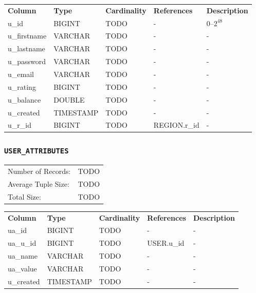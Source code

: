 \documentclass[a4paper,10pt]{article}
\begin{document}
\noindent \begin{tabular*}{\textwidth}{@{\extracolsep{\fill}} lllll}
\textbf{Column} & \textbf{Type} & \textbf{Cardinality} & \textbf{References} & \textbf{Description} \\
u\_id              & BIGINT     & TODO & -               & 0--$2^{48}$ \\
u\_firstname       & VARCHAR    & TODO & -               & - \\
u\_lastname        & VARCHAR    & TODO & -               & - \\
u\_password        & VARCHAR    & TODO & -               & - \\
u\_email           & VARCHAR    & TODO & -               & - \\
u\_rating          & BIGINT     & TODO & -               & - \\
u\_balance         & DOUBLE     & TODO & -               & - \\
u\_created         & TIMESTAMP  & TODO & -               & - \\
u\_r\_id           & BIGINT     & TODO & REGION.r\_id    & - \\
\end{tabular*}

\subsubsection{\texttt{USER\_ATTRIBUTES}}

\begin{tabular}{ll}
Number of Records:      & TODO \\
Average Tuple Size:     & TODO \\
Total Size:             & TODO \\
\end{tabular}

\vspace*{0.1in}

\noindent \begin{tabular*}{\textwidth}{@{\extracolsep{\fill}} lllll}
\textbf{Column} & \textbf{Type} & \textbf{Cardinality} & \textbf{References} & \textbf{Description} \\
ua\_id             & BIGINT     & TODO & -               & - \\
ua\_u\_id          & BIGINT     & TODO & USER.u\_id      & - \\
ua\_name           & VARCHAR    & TODO & -               & - \\
ua\_value          & VARCHAR    & TODO & -               & - \\
u\_created         & TIMESTAMP  & TODO & -               & - \\
\end{tabular*}
\end{document}
